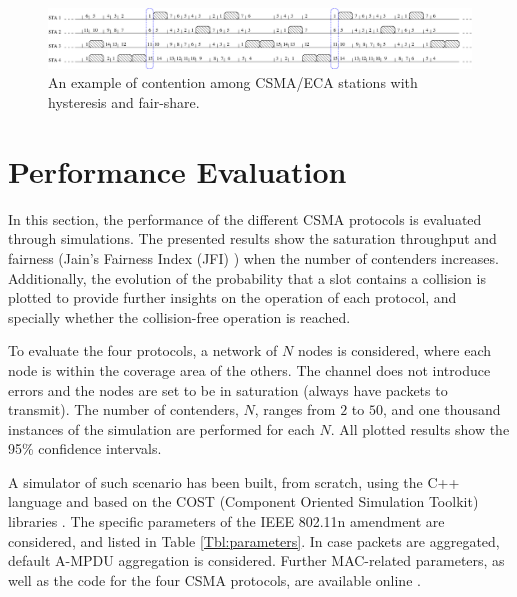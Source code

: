 \documentclass[conference]{IEEEtran}
\newcommand{\AzCom}[1]{}
\newcommand{\AzDel}[1]{}
\begin{document}
\begin{figure}[!!!htb]
\centering
\includegraphics[width=7.0in]{figures/csma_eca_different_backoff}
\caption{An example of contention among CSMA/ECA stations with hysteresis and fair-share.}
\label{fig:csma_eca_different_backoff}
\end{figure}

\section{Performance Evaluation} \label{sec:perf_eval}



In this section, the performance of the different CSMA protocols is evaluated through simulations. The presented results show the saturation throughput and fairness (Jain's Fairness Index (JFI) \cite{jain1984quantitative}) when the number of contenders increases. Additionally, the evolution of the probability that a slot contains a collision is plotted to provide further insights on the operation of each protocol, and specially whether the collision-free operation is reached.


To evaluate the four protocols, a network of $N$ nodes is considered, where each node is within the coverage area of the others. The channel does not introduce errors and the nodes are set to be in saturation (always have packets to transmit). The number of contenders, $N$, ranges from $2$ to $50$, and one thousand instances of the simulation are performed for each $N$. All plotted results show the 95\% confidence intervals.

A simulator of such scenario has been built, from scratch, using the C++ language and based on the COST (Component Oriented Simulation Toolkit) libraries \cite{yucesan2002cost}. The specific parameters of the IEEE 802.11n amendment \cite{IEEE80211n} are considered, and listed in Table \ref{Tbl:parameters}. In case packets are aggregated, default A-MPDU aggregation is considered. Further MAC-related parameters, as well as the code for the four CSMA protocols, are available online \cite{SanabriaSimulatorECA2012}.
\end{document}
